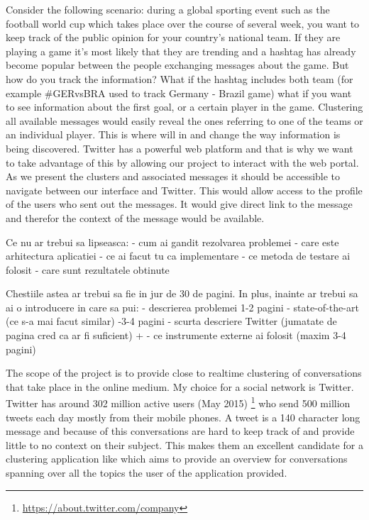 \newline
\newline
Consider the following scenario: during a global sporting event such as the football world cup which takes place over the course of several week, you want to keep track of the public opinion for your country's national team. If they are playing a game it's most likely that they are trending and a hashtag has already become popular between the people exchanging messages about the game. But how do you track the information? What if the hashtag includes both team (for example \#GERvsBRA used to track Germany - Brazil game) what if you want to see information about the first goal, or a certain player in the game. Clustering all available messages would easily reveal the ones referring to one of the teams or an individual player. This is where {\project}  will in and change the way information is being discovered.
\newline
\newline
Twitter has a powerful web platform and that is why we want to take advantage of this by allowing our project to interact with the web portal. As we present the clusters and associated messages it should be accessible to navigate between our interface and Twitter. This would allow access to the profile of the users who sent out the messages. It would give direct link to the message and therefor the context of the message would be available.

Ce nu ar trebui sa lipseasca: 
- cum ai gandit rezolvarea problemei
- care este arhitectura aplicatiei
- ce ai facut tu ca implementare
- ce metoda de testare ai folosit
- care sunt rezultatele obtinute

Chestiile astea ar trebui sa fie in jur de 30 de pagini. In plus, inainte ar trebui sa ai o introducere in care sa pui:
- descrierea problemei 1-2 pagini
- state-of-the-art (ce s-a mai facut similar) -3-4 pagini
- scurta descriere Twitter (jumatate de pagina cred ca ar fi suficient) + - ce instrumente externe ai folosit (maxim 3-4 pagini)

The scope of the project \textbf{\project} is to provide close to realtime 
clustering of conversations that take place in the online medium. My choice for
a social network is Twitter. Twitter has around 302 million active users (May 2015)
\footnote{\url{https://about.twitter.com/company}} who send 500 million tweets
each day mostly from their mobile phones. A tweet is a 140 character long message
and because of this conversations are hard to keep track of and provide little to
no context on their subject. This makes them an excellent candidate for a clustering application like \textbf{\project} which aims to provide an overview for  
conversations spanning over all the topics the user of the application provided.

